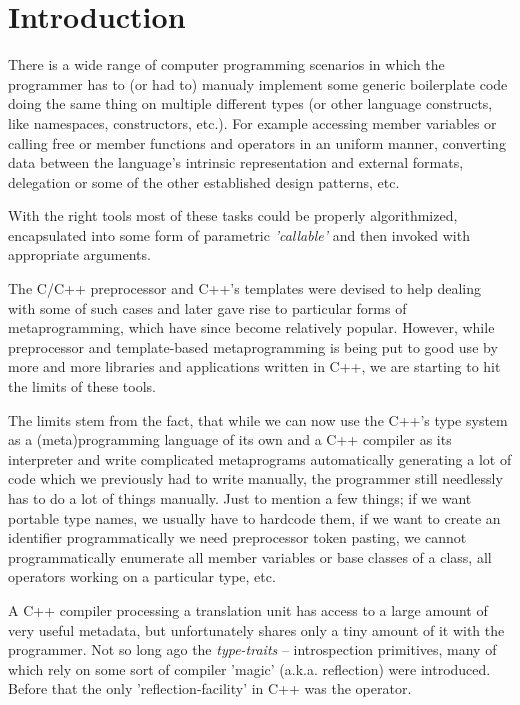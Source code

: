 \section{Introduction}

There is a wide range of computer programming scenarios in which
the programmer has to (or had to) manualy implement some generic boilerplate
code doing the same thing on multiple different types (or other language constructs,
like namespaces, constructors, etc.). For example accessing member variables or
calling free or member functions and operators in an uniform
manner, converting data between the language's intrinsic representation and
external formats, delegation or some of the other
established design patterns, etc.

With the right tools most of these tasks could be properly algorithmized,
encapsulated into some form of parametric {\em 'callable'} and then invoked
with appropriate arguments.

The C/C++ preprocessor and C++'s templates were devised to help dealing
with some of such cases and later gave rise to particular forms of metaprogramming,
which have since become relatively popular. However, while preprocessor and template-based
metaprogramming is being put to good use by more and more libraries and applications written
in C++, we are starting to hit the limits of these tools.

The limits stem from the fact, that while we can now use the C++'s type system
as a (meta)programming language of its own and a C++ compiler as its interpreter
and write complicated metaprograms automatically generating a lot of code
which we previously had to write manually, the programmer still needlessly has to do
a lot of things manually. Just to mention a few things; if we want portable type names,
we usually have to hardcode them, if we want to create an identifier programmatically
we need preprocessor token pasting, we cannot programmatically enumerate all member
variables or base classes of a class, all operators working on a particular type, etc.

A C++ compiler processing a translation unit has access to a large amount
of very useful metadata, but unfortunately shares only a tiny amount of it
with the programmer. Not so long ago the {\em type-traits} -- introspection primitives,
many of which rely on some sort of compiler 'magic' (a.k.a. reflection) were introduced.
Before that the only 'reflection-facility' in C++ was the \verb@typeid@ operator.

